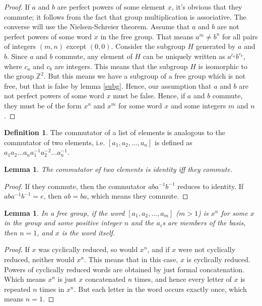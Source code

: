 \documentclass[12pt]{article}
\newtheorem{lem}[thm]{Lemma}
\theoremstyle{definition}
\newtheorem{defn}{Definition}[section]
\begin{document}
\begin{proof}
If $a$ and $b$ are perfect powers of some element $x$, it's obvious that they commute; it follows from the fact that group multiplication is associative. The converse will use the Nielsen-Schreier theorem. Assume that $a$ and $b$ are not perfect powers of some word $x$ in the free group. That means $a^m \neq b^n$ for all pairs of integers $(m,n)$ except $(0,0)$. Consider the subgroup $H$ generated by $a$ and $b$. Since $a$ and $b$ commute, any element of $H$ can be uniquely written as $a^{c_a}b^{c_b}$, where $c_a$ and $c_b$ are integers. This means that the subgroup $H$ is isomorphic to the group $\mathbb{Z}^2$. But this means we have a subgroup of a free group which is not free, but that is false by lemma \autoref{subg}. Hence, our assumption that $a$ and $b$ are not perfect powers of some word $x$ must be false. Hence, if $a$ and $b$ commute, they must be of the form $x^n$ and $x^m$ for some word $x$ and some integers $m$ and $n$.
\end{proof}

\begin{defn}
The commutator of a list of elements is analogous to the commutator of two elements, i.e. $[a_1, a_2, \ldots, a_n]$ is defined as $a_1a_2\ldots a_na_1^{-1}a_2^{-2}\ldots a_n^{-1}$.
\end{defn}

\begin{lem}
The commutator of two elements is identity iff they commute.
\end{lem}

\begin{proof}
If they commute, then the commutator $aba^{-1}b^{-1}$ reduces to identity. If $aba^{-1}b^{-1}=e$, then $ab=ba$, which means they commute. 
\end{proof}

\begin{lem}\label{impo2}
In a free group, if the word $[a_1, a_2, \ldots, a_m]$ ($m>1$) is $x^n$ for some $x$ in the group and some positive integer $n$ and the $a_i$s are members of the basis, then $n=1$, and $x$ is the word itself.
\end{lem}

\begin{proof}
If $x$ was cyclically reduced, so would $x^n$, and if $x$ were not cyclically reduced, neither would $x^n$. This means that in this case, $x$ is cyclically reduced. Powers of cyclically reduced words are obtained by just formal concatenation. Which means $x^n$ is just $x$ concatenated $n$ times, and hence every letter of $x$ is repeated $n$ times in $x^n$. But each letter in the word occurs exactly once, which means $n=1$.
\end{proof}
\end{document}
